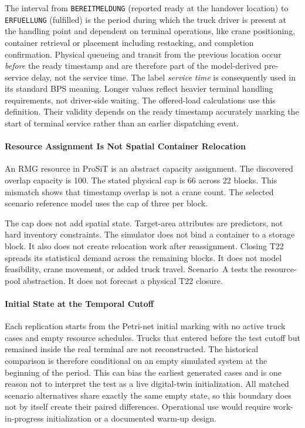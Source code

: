 The interval from \texttt{BEREITMELDUNG} (reported ready at the handover
location) to \texttt{ERFUELLUNG} (fulfilled) is the period during which the
truck driver is present at the handling point and dependent on terminal
operations, like crane positioning, container retrieval or placement including
restacking, and completion confirmation. Physical queueing and transit from
the previous location occur \emph{before} the ready timestamp and are
therefore part of the model-derived pre-service delay, not the service time.
The label \emph{service time} is consequently used in its standard BPS meaning.
Longer values reflect heavier terminal handling requirements, not driver-side
waiting.  The offered-load calculations use this definition. Their validity
depends on the ready timestamp accurately marking the start of terminal
service rather than an earlier dispatching event.

\paragraph{Resource Assignment Is Not Spatial Container Relocation}

An RMG resource in ProSiT is an abstract capacity assignment. The discovered
overlap capacity is 100. The stated physical cap is 66 across 22 blocks. This
mismatch shows that timestamp overlap is not a crane count. The selected
scenario reference model uses the cap of three per block.

The cap does not add spatial state. Target-area attributes are predictors, not
hard inventory constraints. The simulator does not bind a container to a
storage block. It also does not create relocation work after reassignment.
Closing T22 spreads its statistical demand across the remaining blocks. It
does not model feasibility, crane movement, or added truck travel. Scenario~A
tests the resource-pool abstraction. It does not forecast a physical T22
closure.

\paragraph{Initial State at the Temporal Cutoff}

Each replication starts from the Petri-net initial marking with no active
truck cases and empty resource schedules. Trucks that entered before the test
cutoff but remained inside the real terminal are not reconstructed. The
historical comparison is therefore conditional on an empty simulated system
at the beginning of the period. This can bias the earliest generated cases and
is one reason not to interpret the test as a live digital-twin initialization.
All matched scenario alternatives share exactly the same empty state, so this
boundary does not by itself create their paired differences. Operational use
would require work-in-progress initialization or a documented warm-up design.

